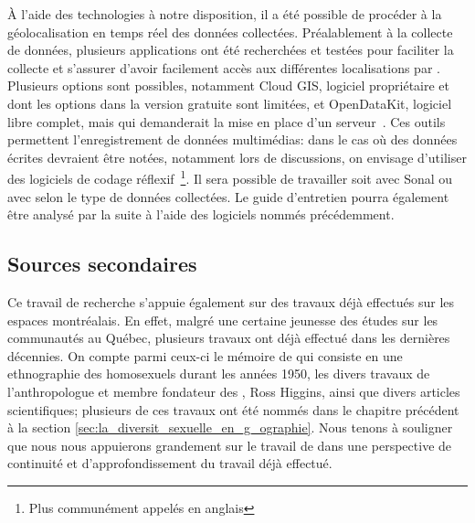 À l'aide des technologies à notre disposition, il a été possible de procéder à la géolocalisation en temps réel des données collectées. 
Préalablement à la collecte de données, plusieurs applications ont été recherchées et testées pour faciliter la collecte et s'assurer d'avoir facilement accès aux différentes localisations par \gps. 
Plusieurs options sont possibles, notamment Cloud GIS, logiciel propriétaire et dont les options dans la version gratuite sont limitées, et OpenDataKit, logiciel libre complet, mais qui demanderait la mise en place d'un serveur~\citep{OpenDataKit2014}. 
Ces outils permettent l'enregistrement de données multimédias: dans le cas où des données écrites devraient être notées, notamment lors de discussions, on envisage d'utiliser des logiciels de codage réflexif~\footnote{Plus communément appelés en anglais   \cadqas}. 
Il sera possible de travailler soit avec Sonal ou avec \rqda{} selon le type de données collectées. 
Le guide d'entretien pourra également être analysé par la suite à l'aide des logiciels nommés précédemment.

\subsection{Sources secondaires}
\label{sub:sources_secondaires}
Ce travail de recherche s'appuie également sur des travaux déjà effectués sur les espaces \qus{} montréalais. 
En effet, malgré une certaine jeunesse des études sur les communautés \lgbt{} au Québec, plusieurs travaux ont déjà effectué dans les dernières décennies. 
On compte parmi ceux-ci le mémoire de \cite{Leznoff1954} qui consiste en une ethnographie des homosexuels durant les années 1950, les divers travaux de l'anthropologue et membre fondateur des \agq{}, Ross Higgins, ainsi que divers articles scientifiques; plusieurs de ces travaux ont été nommés dans le chapitre précédent à la section \ref{sec:la_diversit_sexuelle_en_g_ographie}. 
Nous tenons à souligner que nous nous appuierons grandement sur le travail de \citep{Giraud2014} dans une perspective de continuité et d'approfondissement du travail déjà effectué.

